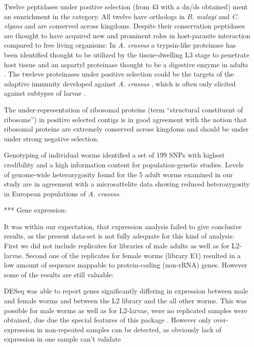 \documentclass[10pt]{bmc_article}
\newenvironment{bmcformat}{\begin{raggedright}\baselineskip20pt\sloppy\setboolean{publ}{false}}{\end{raggedright}\baselineskip20pt\sloppy}
\begin{document}
\begin{bmcformat}
Twelve peptidases under positive selection (from 43 with a dn/ds
obtained) ment an ennrichment in the category. All twelve have
orthologs in \textit{B. malayi} and \textit{C. elgans} and are
conserved across kingdoms. Despite their conservation peptidases are
thought to have acquired new and prominent roles in host-parasite
interaction compared to free living organisms: In \textit{A. crassus}
a trypsin-like proteinase has been identified thought to be utilized
by the tissue-dwelling L3 stage to penetrate host tissue and an
aspartyl proteinase thought to be a digestive enzyme in adults
\cite{polzer_identification_1993}. The tweleve proteinases under
positive selection could be the targets of the adaptive immunity
developed against \textit{A. crassus} \cite{knopf_migratory_2008,
  knopf_vaccination_2008}, which is often only elicited against
subtypes of larvae \cite{molnar_caps}.

The under-representation of ribosomal proteins (term ``structural
constituent of ribosome'') in positive selected contigs is in good
agreement with the notion that ribosomal proteins are extremely
conserved across kingdoms \cite{pmid9664699} and should be under under
strong negative selection.

Genotyping of individual worms identified a set of 199
SNPs with highest credibility and a high information content for
population-genetic studies. Levels of genome-wide heterozygosity found
for the 5 adult worms examined in our study are in agreement with a
microsattelite data showing reduced heterozygosity in European
populations of \textit{A. crassus}. 


*** Gene expression:

It was within our expectation, that expression analysis failed to give
conclusive results, as the present data-set is not fully adequate for
this kind of analysis: First we did not include replicates for
libraries of male adults as well as for L2-larvae. Second one of the
replicates for female worms (library E1) resulted in a low amount of
sequence mappable to protein-coding (non-rRNA) genes.
However some of the results are still valuable:

DESeq was able to report genes significantly differing in expression
between male and female worms and between the L2 library and the all
other worms. This was possible for male worms as well as for
L2-larvae, were no replicated samples were obtained, due due the
special features of this package \cite{pmid20979621}. However only
over-expression in non-repeated samples can be detected, as obviously
lack of expression in one sample can't validate


\end{bmcformat}
\end{document}
